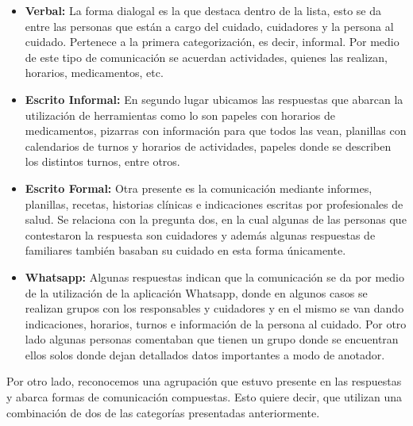 \documentclass[a4paper,12pt]{article}
\begin{document}
    \begin{itemize}
        \item \textbf{Verbal:} La forma dialogal es la que destaca dentro de la lista, esto se da entre las personas que están a cargo del cuidado, cuidadores y la persona al cuidado. Pertenece a la primera categorización, es decir, informal. Por medio de este tipo de comunicación se acuerdan actividades, quienes las realizan, horarios, medicamentos, etc.
        \item \textbf{Escrito Informal:} En segundo lugar ubicamos las respuestas que abarcan la utilización de herramientas como lo son papeles con horarios de medicamentos, pizarras con información para que todos las vean, planillas con calendarios de turnos y horarios de actividades, papeles donde se describen los distintos turnos, entre otros.
        \item \textbf{Escrito Formal:} Otra presente es la comunicación mediante informes, planillas, recetas, historias clínicas e indicaciones escritas por profesionales de salud. Se relaciona con la pregunta dos, en la cual algunas de las personas que contestaron la respuesta son cuidadores y además algunas respuestas de familiares también basaban su cuidado en esta forma únicamente.
        \item \textbf{Whatsapp:} Algunas respuestas indican que la comunicación se da por medio de la utilización de la aplicación Whatsapp, donde en algunos casos se realizan grupos con los responsables y cuidadores y en el mismo se van dando indicaciones, horarios, turnos e información de la persona al cuidado. Por otro lado algunas personas comentaban que tienen un grupo donde se encuentran ellos solos donde dejan detallados datos importantes a modo de anotador.
    \end{itemize}
    \par Por otro lado, reconocemos una agrupación que estuvo presente en las respuestas y abarca formas de comunicación compuestas. Esto quiere decir, que utilizan una combinación de dos de las categorías presentadas anteriormente.
\end{document}
